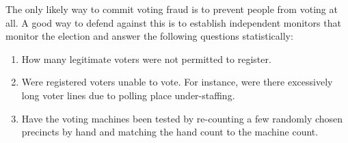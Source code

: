 \documentclass[12pt]{article}
\begin{document}
The only likely way to commit voting fraud is to prevent people from
voting at all.  A good way to defend against this is to establish
independent monitors that monitor the election and answer the following
questions statistically:
\begin{enumerate}
\item How many legitimate voters were not permitted to register.
\item Were registered voters unable to vote.  For instance,
were there excessively long voter lines due to polling place
under-staffing.
\item Have the voting machines been tested by re-counting a few
randomly chosen precincts by hand and matching the hand count
to the machine count.
\end{enumerate}
\end{document}
